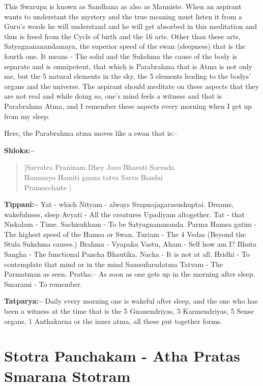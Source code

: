 This Swarupa is known as Sandhana as also as Mauniste. When an aspirant wants to understant the mystery and the true meaning must listen it from a Guru's words he will understand and he will get absorbed in this meditation and thus is freed from the Cycle of birth and the 16 arts. Other than these arts, Satyagnananandamaya, the superior speed of the swan (sleepness) that is the fourth one. It means - The solid and the Sukshma the cause of the body is separate and is omnipotent, that which is Parabrahma that is Atma is not only me, but the 5 natural elements in the sky, the 5 elements leading to the bodys' organs and the universe. The aspirant should meditate on these aspects that they are not real and while doing so, one's mind feels a witness and that is Parabrahma Atma, and I remember these aspects every morning when I get up from my sleep.

Here, the Parabrahma atma moves like a swan that is:–

\textbf{Shloka:–}

\begin{verse}
 [Sarvatra Praninam Dhey Javo Bhavati Sarvada \\
 Hamsasyo Hamiti gnana tatva Sarva Bandai\\ Pramucchaite ]
\end{verse}

\textbf{Tippani:–} Yat - which Nityam - always Svapnajagarasushuptai. Dreams, wakefulness, sleep Avyati - All the creatures Upadiyam altogether. Tat - that Niskalam - Time. Sachisukham - To be Satyagnanananda. Parma Hamsa gatim - The highest speed of the Hamsa or Swan. Turiam - The 4 Vedas (Beyond the Stula Sukshma causes.) Brahma - Vyapaka Vastu, Aham - Self how am I? Bhuta Sangha - The functional Pancha Bhautika. Nacha - It is not at all. Hridhi - To contemplate that mind or in the mind Samsufaradatma Tatvam - The Parmatman as seen. Pratha:– As soon as one gets up in the morning after sleep. Smarami - To remember.

\textbf{Tatparya:–} Daily every morning one is wakeful after sleep, and the one who has been a witness at the time that is the 5 Gnanendriyas, 5 Karmendriyas, 5 Sense organs, 1 Anthakarna or the inner atma, all these put together forms.

\chapter{Stotra Panchakam - Atha Pratas Smarana Stotram}

